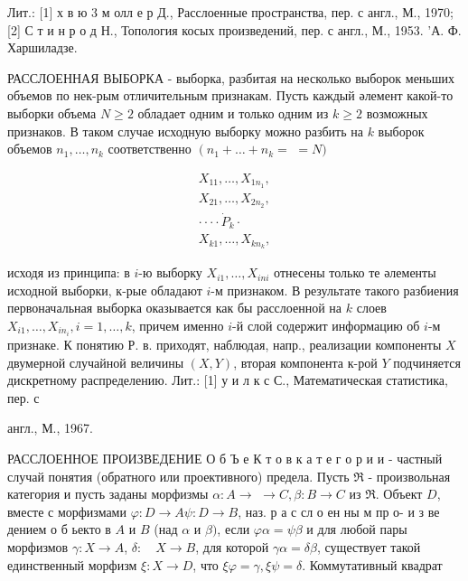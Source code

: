 \documentclass[10pt]{article}
\begin{document}
Лит.: [1] х в ю 3 м олл е р Д., Расслоенные пространства, пер. с англ., М., 1970; [2] С т и н р о д Н., Топология косых произведений, пер. с англ., М., 1953. 'А. Ф. Харшиладзе.



РАССЛОЕННАЯ ВЫБОРКА - выборка, разбитая на несколько выборок меньших объемов по нек-рым отличительным признакам. Пусть каждый әлемент какой-то выборки объема $N \geqslant 2$ обладает одним и только одним из $k \geqslant 2$ возможных признаков. В таком случае исходную выборку можно разбить на $k$ выборок объемов $n_{1}, \ldots, n_{k}$ соответственно $\left(n_{1}+\ldots+n_{k}=\right.$ $=N)$



\[

\begin{gathered}

X_{11}, \ldots, X_{1 n_{1}}, \\

X_{21}, \ldots, X_{2 n_{2}}, \\

\cdot \cdot \cdot \cdot \dot{P}_{k} \cdot \\

X_{k 1}, \ldots, X_{k n_{k}},

\end{gathered}

\]



исходя из принципа: в $i$-ю выборку $X_{i 1}, \ldots, X_{i n i}$ отнесены только те әлементы исходной выборки, к-рые обладают $i$-м признаком. В результате такого разбиения первоначальная выборка оказывается как бы расслоенной на $k$ слоев $X_{i 1}, \ldots, X_{i n_{i}}, i=1, \ldots, k$, причем именно $i$-й слой содержит информацию об $i$-м признаке. $К$ понятию Р. в. приходят, наблюдая, напр., реализации компоненты $X$ двумерной случайной величины $(X, Y)$, вторая компонента к-рой $Y$ подчиняется дискретному распределению. Лит.: [1] у и л к с С., Математическая статистика, пер. с

англ., М., 1967.



РАССЛОЕННОЕ ПРОИЗВЕДЕНИЕ О б Ъ е К т о в к а т е г о р и и - частный случай понятия (обратного или проективного) предела. Пусть $\mathfrak{R}$ - произвольная категория и пусть заданы морфизмы $\alpha: A \rightarrow$ $\rightarrow C, \beta: B \rightarrow C$ из $\Re$. Объект $D$, вместе с морфизмами $\varphi: D \rightarrow A \psi: D \rightarrow B$, наз. р а с сл о ен ны м пр о- и з ве дением о б ьекто в $A$ и $B$ (над $\alpha$ и $\beta)$, если $\varphi \alpha=\psi \beta$ и для любой пары морфизмов $\gamma: X \rightarrow A$, $\delta: \quad X \rightarrow B$, для которой $\gamma \alpha=\delta \beta$, существует такой единственный морфизм $\xi: X \rightarrow D$, что $\xi \varphi=\gamma, \xi \psi=\delta$. Коммутативный квадрат
\end{document}

